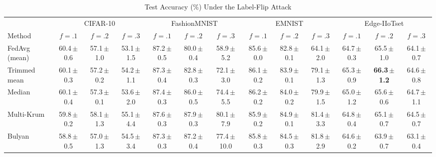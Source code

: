 \begin{table}[!t]\centering\footnotesize
\caption{Test Accuracy (\%) Under the Label-Flip Attack}
\label{tab:labelflip}
\setlength{\tabcolsep}{2.5pt}
\begin{tabular}{@{}lcccccccccccc@{}}\toprule
& \multicolumn{3}{c}{CIFAR-10} & \multicolumn{3}{c}{FashionMNIST} & \multicolumn{3}{c}{EMNIST} & \multicolumn{3}{c}{Edge-IIoTset}\\
\cmidrule(lr){2-4}\cmidrule(lr){5-7}\cmidrule(lr){8-10}\cmidrule(l){11-13}
Method & $f{=}.1$ & $f{=}.2$ & $f{=}.3$ & $f{=}.1$ & $f{=}.2$ & $f{=}.3$ & $f{=}.1$ & $f{=}.2$ & $f{=}.3$ & $f{=}.1$ & $f{=}.2$ & $f{=}.3$\\\midrule
FedAvg (mean)~\cite{mcmahan2017} & 60.4\,{\scriptsize$\pm$0.6} & 57.1\,{\scriptsize$\pm$1.0} & 53.1\,{\scriptsize$\pm$1.5} & 87.2\,{\scriptsize$\pm$0.5} & 80.0\,{\scriptsize$\pm$0.4} & 58.9\,{\scriptsize$\pm$5.2} & 85.6\,{\scriptsize$\pm$0.0} & 82.8\,{\scriptsize$\pm$0.1} & 64.1\,{\scriptsize$\pm$2.0} & 64.7\,{\scriptsize$\pm$0.3} & 65.5\,{\scriptsize$\pm$1.0} & 64.1\,{\scriptsize$\pm$0.7}\\
Trimmed mean~\cite{yin2018} & 60.1\,{\scriptsize$\pm$0.3} & 57.2\,{\scriptsize$\pm$0.2} & 54.2\,{\scriptsize$\pm$1.1} & 87.3\,{\scriptsize$\pm$0.4} & 82.8\,{\scriptsize$\pm$0.3} & 72.1\,{\scriptsize$\pm$3.0} & 86.1\,{\scriptsize$\pm$0.2} & 83.9\,{\scriptsize$\pm$0.1} & 79.1\,{\scriptsize$\pm$1.3} & 65.3\,{\scriptsize$\pm$0.9} & \textbf{66.3\,{\scriptsize$\pm$1.2}} & 64.6\,{\scriptsize$\pm$0.8}\\
Median~\cite{yin2018} & 60.1\,{\scriptsize$\pm$0.4} & 57.3\,{\scriptsize$\pm$0.1} & 53.6\,{\scriptsize$\pm$2.0} & 87.4\,{\scriptsize$\pm$0.3} & 86.0\,{\scriptsize$\pm$0.5} & 74.4\,{\scriptsize$\pm$5.5} & 86.2\,{\scriptsize$\pm$0.2} & 84.0\,{\scriptsize$\pm$0.2} & 79.9\,{\scriptsize$\pm$1.5} & 65.0\,{\scriptsize$\pm$1.2} & 65.6\,{\scriptsize$\pm$0.6} & 64.7\,{\scriptsize$\pm$1.1}\\
Multi-Krum~\cite{blanchard2017} & 59.8\,{\scriptsize$\pm$0.2} & 58.1\,{\scriptsize$\pm$1.3} & 55.1\,{\scriptsize$\pm$4.4} & 87.6\,{\scriptsize$\pm$0.3} & 87.9\,{\scriptsize$\pm$0.3} & 80.1\,{\scriptsize$\pm$7.9} & 85.9\,{\scriptsize$\pm$0.2} & 84.9\,{\scriptsize$\pm$0.1} & 81.4\,{\scriptsize$\pm$3.3} & 64.8\,{\scriptsize$\pm$0.4} & 65.1\,{\scriptsize$\pm$0.7} & 64.5\,{\scriptsize$\pm$0.7}\\
Bulyan~\cite{bulyan} & 58.8\,{\scriptsize$\pm$0.5} & 57.0\,{\scriptsize$\pm$1.3} & 54.5\,{\scriptsize$\pm$3.4} & 87.3\,{\scriptsize$\pm$0.3} & 87.2\,{\scriptsize$\pm$0.4} & 77.4\,{\scriptsize$\pm$10.0} & 85.8\,{\scriptsize$\pm$0.3} & 84.5\,{\scriptsize$\pm$0.3} & 81.8\,{\scriptsize$\pm$2.9} & 64.6\,{\scriptsize$\pm$0.2} & 63.9\,{\scriptsize$\pm$0.7} & 63.1\,{\scriptsize$\pm$0.4}\\

\end{tabular}
\end{table}
